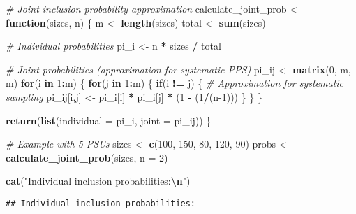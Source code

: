 \documentclass[
]{article}
\newenvironment{Shaded}{\begin{snugshade}}{\end{snugshade}}
\newcommand{\AttributeTok}[1]{\textcolor[rgb]{0.13,0.29,0.53}{#1}}
\newcommand{\CommentTok}[1]{\textcolor[rgb]{0.56,0.35,0.01}{\textit{#1}}}
\newcommand{\ControlFlowTok}[1]{\textcolor[rgb]{0.13,0.29,0.53}{\textbf{#1}}}
\newcommand{\DecValTok}[1]{\textcolor[rgb]{0.00,0.00,0.81}{#1}}
\newcommand{\FunctionTok}[1]{\textcolor[rgb]{0.13,0.29,0.53}{\textbf{#1}}}
\newcommand{\NormalTok}[1]{#1}
\newcommand{\OtherTok}[1]{\textcolor[rgb]{0.56,0.35,0.01}{#1}}
\newcommand{\SpecialCharTok}[1]{\textcolor[rgb]{0.81,0.36,0.00}{\textbf{#1}}}
\newcommand{\StringTok}[1]{\textcolor[rgb]{0.31,0.60,0.02}{#1}}
\begin{document}
\begin{Shaded}
\begin{Highlighting}[]
\CommentTok{\# Joint inclusion probability approximation}
\NormalTok{calculate\_joint\_prob }\OtherTok{\textless{}{-}} \ControlFlowTok{function}\NormalTok{(sizes, n) \{}
\NormalTok{  m }\OtherTok{\textless{}{-}} \FunctionTok{length}\NormalTok{(sizes)}
\NormalTok{  total }\OtherTok{\textless{}{-}} \FunctionTok{sum}\NormalTok{(sizes)}
  
  \CommentTok{\# Individual probabilities}
\NormalTok{  pi\_i }\OtherTok{\textless{}{-}}\NormalTok{ n }\SpecialCharTok{*}\NormalTok{ sizes }\SpecialCharTok{/}\NormalTok{ total}
  
  \CommentTok{\# Joint probabilities (approximation for systematic PPS)}
\NormalTok{  pi\_ij }\OtherTok{\textless{}{-}} \FunctionTok{matrix}\NormalTok{(}\DecValTok{0}\NormalTok{, m, m)}
  \ControlFlowTok{for}\NormalTok{(i }\ControlFlowTok{in} \DecValTok{1}\SpecialCharTok{:}\NormalTok{m) \{}
    \ControlFlowTok{for}\NormalTok{(j }\ControlFlowTok{in} \DecValTok{1}\SpecialCharTok{:}\NormalTok{m) \{}
      \ControlFlowTok{if}\NormalTok{(i }\SpecialCharTok{!=}\NormalTok{ j) \{}
        \CommentTok{\# Approximation for systematic sampling}
\NormalTok{        pi\_ij[i,j] }\OtherTok{\textless{}{-}}\NormalTok{ pi\_i[i] }\SpecialCharTok{*}\NormalTok{ pi\_i[j] }\SpecialCharTok{*}\NormalTok{ (}\DecValTok{1} \SpecialCharTok{{-}}\NormalTok{ (}\DecValTok{1}\SpecialCharTok{/}\NormalTok{(n}\DecValTok{{-}1}\NormalTok{)))}
\NormalTok{      \}}
\NormalTok{    \}}
\NormalTok{  \}}
  
  \FunctionTok{return}\NormalTok{(}\FunctionTok{list}\NormalTok{(}\AttributeTok{individual =}\NormalTok{ pi\_i, }\AttributeTok{joint =}\NormalTok{ pi\_ij))}
\NormalTok{\}}

\CommentTok{\# Example with 5 PSUs}
\NormalTok{sizes }\OtherTok{\textless{}{-}} \FunctionTok{c}\NormalTok{(}\DecValTok{100}\NormalTok{, }\DecValTok{150}\NormalTok{, }\DecValTok{80}\NormalTok{, }\DecValTok{120}\NormalTok{, }\DecValTok{90}\NormalTok{)}
\NormalTok{probs }\OtherTok{\textless{}{-}} \FunctionTok{calculate\_joint\_prob}\NormalTok{(sizes, }\AttributeTok{n =} \DecValTok{2}\NormalTok{)}

\FunctionTok{cat}\NormalTok{(}\StringTok{"Individual inclusion probabilities:}\SpecialCharTok{\textbackslash{}n}\StringTok{"}\NormalTok{)}
\end{Highlighting}
\end{Shaded}

\begin{verbatim}
## Individual inclusion probabilities:
\end{verbatim}
\end{document}
